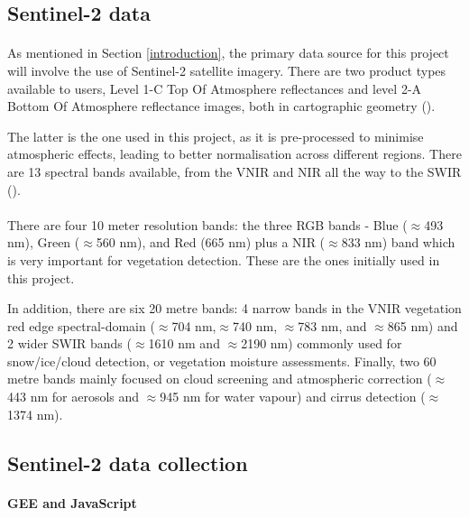 \subsection{Sentinel-2 data} \label{sentinel2_section}
\paragraph{}
As mentioned in Section \ref{introduction}, the primary data source for this project will involve the use of Sentinel-2 satellite imagery. There are two product types available to users, Level 1-C Top Of Atmosphere reflectances and level 2-A Bottom Of Atmosphere reflectance images, both in cartographic geometry (\cite{sentinel2}). 

The latter is the one used in this project, as it is pre-processed to minimise atmospheric effects, leading to better normalisation across different regions.
There are 13 spectral bands available, from the \gls{VNIR} and \gls{NIR} all the way to the \gls{SWIR} (\cite{sentinel2}).

\paragraph{}
There are four 10 meter resolution bands: the three \gls{RGB} bands - Blue ($\approx$493 nm), Green ($\approx$560 nm), and Red (665 nm) plus a \gls{NIR} ($\approx$833 nm) band which is very important for vegetation detection. These are the ones initially used in this project.

In addition, there are six 20 metre bands: 4 narrow bands in the \gls{VNIR} vegetation red edge spectral-domain ($\approx$704 nm,$\approx$740 nm, $\approx$783 nm, and $\approx$865 nm) and 2 wider \gls{SWIR} bands ($\approx$1610 nm and $\approx$2190 nm) commonly used for snow/ice/cloud detection, or vegetation moisture assessments. Finally, two 60 metre bands mainly focused on cloud screening and atmospheric correction ($\approx$443 nm for aerosols and $\approx$945 nm for water vapour) and cirrus detection ($\approx$1374 nm).

\subsection{Sentinel-2 data collection} \label{rs_data_collection}

\paragraph{\gls{GEE} and JavaScript}

